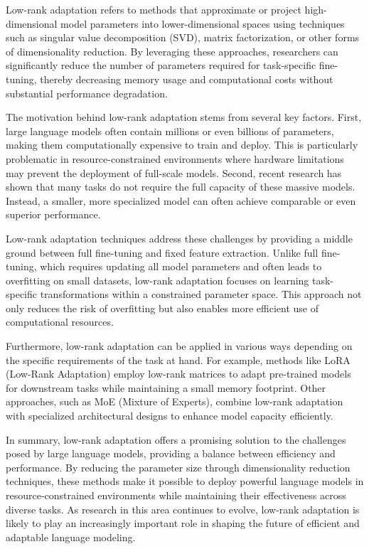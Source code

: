 \documentclass[conference]{IEEEtran}
\begin{document}
Low-rank adaptation refers to methods that approximate or project high-dimensional model parameters into lower-dimensional spaces using techniques such as singular value decomposition (SVD), matrix factorization, or other forms of dimensionality reduction. By leveraging these approaches, researchers can significantly reduce the number of parameters required for task-specific fine-tuning, thereby decreasing memory usage and computational costs without substantial performance degradation.

The motivation behind low-rank adaptation stems from several key factors. First, large language models often contain millions or even billions of parameters, making them computationally expensive to train and deploy. This is particularly problematic in resource-constrained environments where hardware limitations may prevent the deployment of full-scale models. Second, recent research has shown that many tasks do not require the full capacity of these massive models. Instead, a smaller, more specialized model can often achieve comparable or even superior performance.

Low-rank adaptation techniques address these challenges by providing a middle ground between full fine-tuning and fixed feature extraction. Unlike full fine-tuning, which requires updating all model parameters and often leads to overfitting on small datasets, low-rank adaptation focuses on learning task-specific transformations within a constrained parameter space. This approach not only reduces the risk of overfitting but also enables more efficient use of computational resources.

Furthermore, low-rank adaptation can be applied in various ways depending on the specific requirements of the task at hand. For example, methods like LoRA (Low-Rank Adaptation) employ low-rank matrices to adapt pre-trained models for downstream tasks while maintaining a small memory footprint. Other approaches, such as MoE (Mixture of Experts), combine low-rank adaptation with specialized architectural designs to enhance model capacity efficiently.

In summary, low-rank adaptation offers a promising solution to the challenges posed by large language models, providing a balance between efficiency and performance. By reducing the parameter size through dimensionality reduction techniques, these methods make it possible to deploy powerful language models in resource-constrained environments while maintaining their effectiveness across diverse tasks. As research in this area continues to evolve, low-rank adaptation is likely to play an increasingly important role in shaping the future of efficient and adaptable language modeling.
\end{document}
